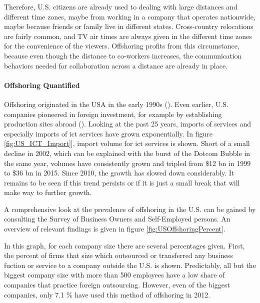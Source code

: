 Therefore, U.S. citizens are already used to dealing with large distances and different time zones, maybe from working in a company that operates nationwide, maybe because friends or family live in different states. Cross-country relocations are fairly common, and TV air times are always given in the different time zones for the convenience of the viewers. Offshoring profits from this circumstance, because even though the distance to co-workers increases, the communication behaviors needed for collaboration across a distance are already in place.





\paragraph{Offshoring Quantified}
Offshoring originated in the USA in the early 1990s (\cite[p. 389]{Pisani.2016}). Even earlier, U.S. companies pioneered in foreign investment, for example by establishing production sites abroad (\cite[p. 5]{Kozlow.2006}). Looking at the past 25 years, imports of services and especially imports of \gls{ict} services have grown exponentially. In figure \ref{fig:US_ICT_Import}], import volume for \gls{ict} services is shown. Short of a small decline in 2002, which can be explained with the burst of the Dotcom Bubble in the same year, volumes have consistently grown and tripled from \$12 bn in 1999 to \$36 bn in 2015. Since 2010, the growth has slowed down considerably. It remains to be seen if this trend persists or if it is just a small break that will make way to further growth.


A comprehensive look at the prevalence of offshoring in the U.S. can be gained by consulting the Survey of Business Owners and Self-Employed persons. An overview of relevant findings is given in figure \ref{fig:USOffshoringPercent}.

In this graph, for each company size there are several percentages given. First, the percent of firms that size which outsourced or transferred any business fuction or service to a company outside the U.S. is shown. Predictably, all but the biggest company size with more than 500 employees have a low share of companies that practice foreign outsourcing. However, even of the biggest companies, only 7.1 \% have used this method of offshoring in 2012.

